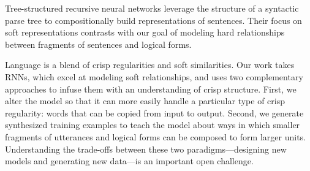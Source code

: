 \documentclass[11pt,letterpaper]{article}
\begin{document}
Tree-structured recursive neural networks \cite{socher2012mvrnn,socher2013recursive}
leverage the structure of a syntactic parse tree
to compositionally build representations of sentences.
Their focus on soft representations
contrasts with our goal of modeling hard relationships between
fragments of sentences and logical forms.

Language is a blend of crisp regularities and soft similarities.
Our work takes RNNs, which excel at modeling soft relationships,
and uses two complementary approaches 
to infuse them with an understanding of crisp structure.
First, we alter the model so that it can more easily
handle a particular type of crisp regularity: words
that can be copied from input to output.
Second, we generate synthesized training examples
to teach the model about ways in which
smaller fragments of utterances and logical forms
can be composed to form larger units.
Understanding the trade-offs between
these two paradigms---designing new models and 
generating new data---is an important open challenge.





\end{document}
